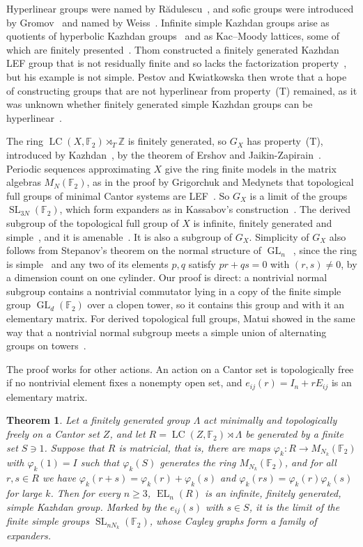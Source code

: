 \documentclass[11pt]{amsart}
\newtheorem{theorem}{Theorem}
\newcommand{\F}{\mathbb F}
\newcommand{\Z}{\mathbb Z}
\newcommand{\LC}{\operatorname{LC}}
\newcommand{\EL}{\operatorname{EL}}
\newcommand{\GL}{\operatorname{GL}}
\newcommand{\SL}{\operatorname{SL}}
\begin{document}
Hyperlinear groups were named by R\u{a}dulescu~\cite{Radulescu}, and sofic
groups were introduced by Gromov~\cite{Gromov99} and named by
Weiss~\cite{Weiss}. Infinite simple Kazhdan groups arise as quotients of
hyperbolic Kazhdan groups~\cite{Gromov87} and as Kac--Moody lattices, some
of which are finitely presented~\cite{CapraceRemy}. Thom constructed a
finitely generated Kazhdan LEF group that is not residually finite and so
lacks the factorization property~\cite{Thom}, but his example is not
simple. Pestov and Kwiatkowska then wrote that a hope of constructing
groups that are not hyperlinear from property~\textup{(T)} remained, as it
was unknown whether finitely generated simple Kazhdan groups can be
hyperlinear~\cite{PestovKwiatkowska}.

The ring $\LC(X,\F_2)\rtimes_T\Z$ is finitely generated, so $G_X$ has
property~\textup{(T)}, introduced by Kazhdan~\cite{Kazhdan}, by the theorem
of Ershov and Jaikin-Zapirain~\cite{EJZ}. Periodic sequences approximating
$X$ give the ring finite models in the matrix algebras $M_N(\F_2)$,
as in the proof by Grigorchuk and Medynets that topological full groups
of minimal Cantor systems are LEF~\cite[Theorem~2.6]{GM}. So $G_X$ is a
limit of the groups $\SL_{3N}(\F_2)$, which form expanders as in
Kassabov's construction~\cite{Kassabov}. The derived subgroup of the
topological full group of $X$ is infinite, finitely generated and
simple~\cite{Matui}, and it is amenable~\cite{JuschenkoMonod}. It is also a
subgroup of $G_X$. Simplicity of $G_X$ also follows from Stepanov's
theorem on the normal structure of $\GL_n$~\cite[Theorem~4.4]{Stepanov},
since the ring is simple~\cite[Corollary~4.6]{ClarkEdie} and any two of
its elements $p,q$ satisfy $pr+qs=0$ with $(r,s)\ne0$, by a dimension
count on one cylinder. Our proof is direct: a nontrivial normal subgroup
contains a nontrivial commutator lying in a copy of the finite simple
group $\GL_d(\F_2)$ over a clopen tower, so it contains this group and
with it an elementary matrix. For derived topological full groups, Matui
showed in the same way that a nontrivial normal subgroup meets a simple
union of alternating groups on towers~\cite[Lemma~3.4 and
Theorem~4.9]{Matui}.

The proof works for other actions. An action on a Cantor set is
topologically free if no nontrivial element fixes a nonempty open set,
and $e_{ij}(r)=I_n+rE_{ij}$ is an elementary matrix.

\begin{theorem}\label{thm:general}
Let a finitely generated group $\Lambda$ act minimally and topologically
freely on a Cantor set $Z$, and let $R=\LC(Z,\F_2)\rtimes\Lambda$ be
generated by a finite set $S\ni1$. Suppose that $R$ is matricial, that
is, there are maps $\varphi_k\colon R\to M_{N_k}(\F_2)$ with
$\varphi_k(1)=I$ such that $\varphi_k(S)$ generates the ring
$M_{N_k}(\F_2)$, and for all $r,s\in R$ we have
$\varphi_k(r+s)=\varphi_k(r)+\varphi_k(s)$ and
$\varphi_k(rs)=\varphi_k(r)\varphi_k(s)$ for large $k$. Then for every
$n\ge3$, $\EL_n(R)$ is an infinite, finitely generated, simple Kazhdan
group. Marked by the $e_{ij}(s)$ with $s\in S$, it is the limit of the
finite simple groups $\SL_{nN_k}(\F_2)$, whose Cayley graphs form a
family of expanders.
\end{theorem}
\end{document}
